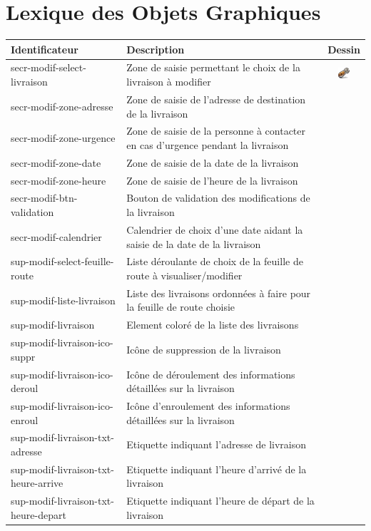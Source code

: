 \documentclass{report}
\begin{document}
\section{Lexique des Objets Graphiques}

\begin{longtable}{|p{5cm}|p{5cm}|c|}
\hline
Identificateur&Description&Dessin\\\hline
secr-modif-select-livraison&Zone de saisie permettant le choix de la livraison à modifier&\includegraphics{images/tools.png}\\\hline
secr-modif-zone-adresse&Zone de saisie de l'adresse de destination de la livraison&\\\hline
secr-modif-zone-urgence&Zone de saisie de la personne à contacter en cas d'urgence pendant la livraison&\\\hline
secr-modif-zone-date&Zone de saisie de la date de la livraison&\\\hline
secr-modif-zone-heure&Zone de saisie de l'heure de la livraison&\\\hline
secr-modif-btn-validation&Bouton de validation des modifications de la livraison&\\\hline
secr-modif-calendrier&Calendrier de choix d'une date aidant la saisie de la date de la livraison&\\\hline
sup-modif-select-feuille-route&Liste déroulante de choix de la feuille de route à visualiser/modifier&\\\hline
sup-modif-liste-livraison&Liste des livraisons ordonnées à faire pour la feuille de route choisie&\\\hline
sup-modif-livraison&Element coloré de la liste des livraisons&\\\hline
sup-modif-livraison-ico-suppr&Icône de suppression de la livraison&\\\hline
sup-modif-livraison-ico-deroul&Icône de déroulement des informations détaillées sur la livraison&\\\hline
sup-modif-livraison-ico-enroul&Icône d'enroulement des informations détaillées sur la livraison&\\\hline
sup-modif-livraison-txt-adresse&Etiquette indiquant l'adresse de livraison&\\\hline
sup-modif-livraison-txt-heure-arrive&Etiquette indiquant l'heure d'arrivé de la livraison&\\\hline
sup-modif-livraison-txt-heure-depart&Etiquette indiquant l'heure de départ de la livraison&\\\hline

\end{longtable}
\end{document}
